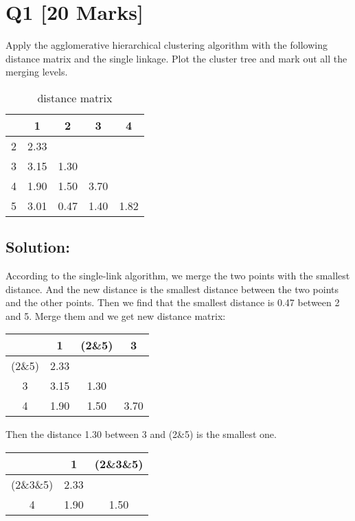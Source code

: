 \section*{Q1 [20 Marks]}

Apply the agglomerative hierarchical clustering algorithm with the following distance matrix and the single linkage. Plot the cluster tree and mark out all the merging levels.

\begin{table}[h]
    \centering
    \begin{tabular}{@{}c|cccc@{}}
        \hline
        & 1 & 2 & 3 & 4 \\
        \hline

        2 & 2.33 &      &      &     \\
        3 & 3.15 & 1.30 &      &     \\
        4 & 1.90 & 1.50 & 3.70 &     \\
        5 & 3.01 & 0.47 & 1.40 & 1.82 \\
    \end{tabular}
    \caption{distance matrix}
\end{table}

\subsection*{Solution:}

According to the single-link algorithm, we merge the two points with the smallest distance.
And the new distance is the smallest distance between the two points and the other points.
Then we find that the smallest distance is 0.47 between 2 and 5.
Merge them and we get new distance matrix:

\begin{table}[h]
    \centering
    \begin{tabular}{@{}c|ccc@{}}
        \hline
        & 1  & (2\&5) & 3 \\
        \hline

        (2\&5) & 2.33 &      &     \\
        3 & 3.15 & 1.30 &     \\
        4 & 1.90 & 1.50 & 3.70      \\
    \end{tabular}
\end{table}

Then the distance 1.30 between 3 and (2\&5) is the smallest one.

\begin{table}[h]
    \centering
    \begin{tabular}{@{}c|cc@{}}
        \hline
        & 1  & (2\&3\&5) \\
        \hline

        (2\&3\&5) & 2.33 &     \\
        4 & 1.90 & 1.50 \\
    \end{tabular}
\end{table}


